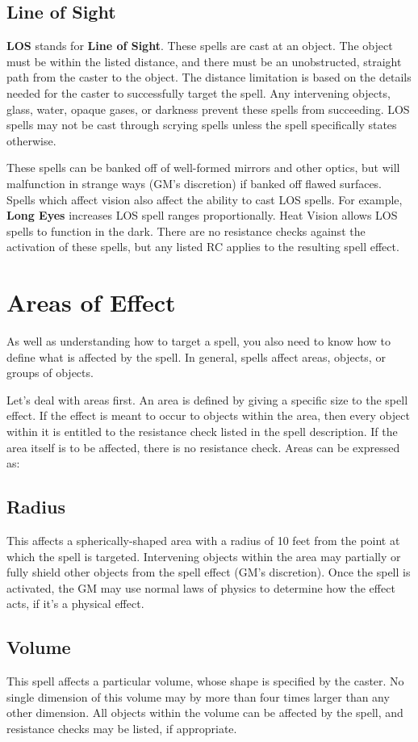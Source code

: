 \begin{multicols*}{2}
\subsection{Line of Sight}
 \textbf{LOS} stands for \textbf{Line of Sight}. These spells are cast at an object. The object must be within the listed distance, and there must be an unobstructed, straight path from the caster to the object. The distance limitation is based on the details needed for the caster to successfully target the spell. Any intervening objects, glass, water, opaque gases, or darkness prevent these spells from succeeding. LOS spells may not be cast through scrying spells unless the spell specifically states otherwise.

These spells can be banked off of well-formed mirrors and other optics, but will malfunction in strange ways (GM's discretion) if banked off flawed surfaces. Spells which affect vision also affect the ability to cast LOS spells. For example, \textbf{Long Eyes} increases LOS spell ranges proportionally. Heat Vision allows LOS spells to function in the dark. There are no resistance checks against the activation of these spells, but any listed RC applies to the resulting spell effect.
\section{Areas of Effect}
As well as understanding how to target a spell, you also need to know how to define what is affected by the spell. In general, spells affect areas, objects, or groups of objects.

Let's deal with areas first. An area is defined by giving a specific size to the spell effect. If the effect is meant to occur to objects within the area, then every object within it is entitled to the resistance check listed in the spell description. If the area itself is to be affected, there is no resistance check. Areas can be expressed as:
\subsection{Radius}
 This affects a spherically-shaped area with a radius of 10 feet from the point at which the spell is targeted. Intervening objects within the area may partially or fully shield other objects from the spell effect (GM's discretion). Once the spell is activated, the GM may use normal laws of physics to determine how the effect acts, if it's a physical effect.
\subsection{Volume}
 This spell affects a particular volume, whose shape is specified by the caster. No single dimension of this volume may by more than four times larger than any other dimension. All objects within the volume can be affected by the spell,
and resistance checks may be listed, if appropriate.

\end{multicols*}
